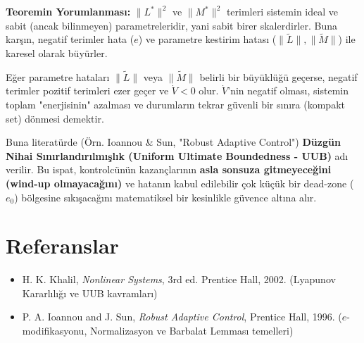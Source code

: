 \documentclass[12pt,a4paper]{article}
\begin{document}
\textbf{Teoremin Yorumlanması:}
$\|L^*\|^2$ ve $\|M^*\|^2$ terimleri sistemin ideal ve sabit (ancak bilinmeyen) parametreleridir, yani sabit birer skalerdirler. Buna karşın, negatif terimler hata ($e$) ve parametre kestirim hatası ($\|\tilde{L}\|, \|\tilde{M}\|$) ile karesel olarak büyürler. 

Eğer parametre hataları $\|\tilde{L}\|$ veya $\|\tilde{M}\|$ belirli bir büyüklüğü geçerse, negatif terimler pozitif terimleri ezer geçer ve $\dot{V} < 0$ olur. $\dot{V}$'nin negatif olması, sistemin toplam "enerjisinin" azalması ve durumların tekrar güvenli bir sınıra (kompakt set) dönmesi demektir. 

Buna literatürde (Örn. Ioannou \& Sun, "Robust Adaptive Control") \textbf{Düzgün Nihai Sınırlandırılmışlık (Uniform Ultimate Boundedness - UUB)} adı verilir. Bu ispat, kontrolcünün kazançlarının \textbf{asla sonsuza gitmeyeceğini (wind-up olmayacağını)} ve hatanın kabul edilebilir çok küçük bir dead-zone ($e_0$) bölgesine sıkışacağını matematiksel bir kesinlikle güvence altına alır.

\section{Referanslar}
\begin{itemize}
    \item H. K. Khalil, \emph{Nonlinear Systems}, 3rd ed. Prentice Hall, 2002. (Lyapunov Kararlılığı ve UUB kavramları)
    \item P. A. Ioannou and J. Sun, \emph{Robust Adaptive Control}, Prentice Hall, 1996. ($e$-modifikasyonu, Normalizasyon ve Barbalat Lemması temelleri)
\end{itemize}
\end{document}
